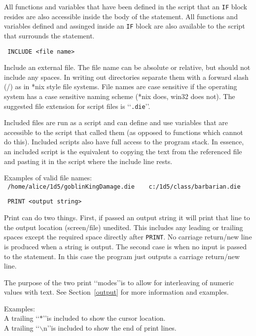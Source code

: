 All functions and variables that have been defined in the script that an
\texttt{IF} block resides are also accessible inside the body of the statement.
All functions and variables defined and assinged inside an \texttt{IF} block
are also available to the script that surrounds the statement.

\breakline

\noindent\texttt{%
INCLUDE <file name>}

Include an external file. The file name can be absolute or relative, but
should not include any spaces. In writing out directories separate them with a
forward slash (/) as in *nix style file systems. File names are case sensitive
if the operating system has a case sensitive naming scheme (*nix does, win32
does not). The suggested file extension for script files is
\lq\lq\texttt{.die}\rq\rq.

Included files are run as a script and can define and use variables that are
accessible to the script that called them (as opposed to functions which
cannot do this). Included scripts also have full access to the program stack.
In essence, an included script is the equivalent to copying the text from the
referenced file and pasting it in the script where the include line rests.

\noindent Examples of valid file names:\\
\texttt{%
/home/alice/1d5/goblinKingDamage.die \ \ \ c:/1d5/class/barbarian.die
}

\breakline

\noindent\texttt{%
PRINT <output string>}

Print can do two things. First, if passed an output string it will print that
line to the output location (screen/file) unedited. This includes any leading
or trailing spaces except the required space directly after \texttt{PRINT}. No
carriage return/new line is produced when a string is output.
The second case is when no input is passed to the statement. In this case the
program just outputs a carriage return/new line.

The purpose of the two print \lq\lq modes\rq\rq is to allow for interleaving of
numeric values with text. See Section~\ref{output} for more information and
examples.

\noindent Examples:\\
A trailing \lq\lq$\ast$\rq\rq is included to show the cursor location.\\
A trailing \lq\lq$\backslash$n\rq\rq is included to show the end of print lines.

